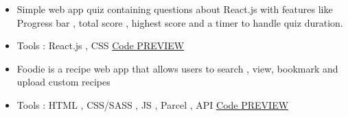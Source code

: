 \documentclass[10pt,a4paper,ragged2e,withhyper]{altacv}
\begin{document}



\makecvheader





\begin{paracol}{2}


\begin{itemize}
\item[\ding{32}] Simple web app quiz containing questions about React.js with features like Progress bar , total score , highest score and a timer to handle quiz duration.
\vspace{0.1cm}
\item[\ding{32}] Tools : React.js , CSS
\newline
\vspace{0.2cm}
\href{https://github.com/iknevo/react-quiz}{\faCode \hspace{0.01cm} Code }
\hspace{0.1cm}
\href{https://nevo-react-quiz.vercel.app/}{\faGlobe \hspace{0.01cm} PREVIEW}




\end{itemize}

\divider

\begin{itemize}
\item[\ding{32}] Foodie is a recipe web app that allows users to search , view, bookmark and upload custom recipes
\vspace{0.1cm}
\item[\ding{32}] Tools : HTML , CSS/SASS , JS , Parcel , API
\vspace{0.2cm}
\newline
\href{https://github.com/iknevo/foodie}{\faCode \hspace{0.01cm} Code }
\hspace{0.1cm}
\href{https://nevo-foodie.vercel.app/}{\faGlobe \hspace{0.01cm} PREVIEW}




\end{itemize}
\end{paracol}
\end{document}
